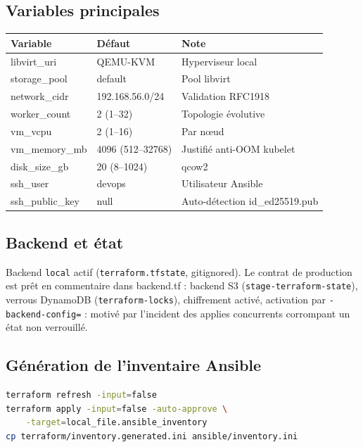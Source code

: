 \documentclass[12pt,a4paper,twoside,openright]{report}
\begin{document}
\subsection{Variables principales}
\begin{center}\label{tab:ch-terraform-variables-principales}\end{center}
\begin{longtable}{@{}p{4.6cm}p{4.0cm}p{5.6cm}@{}}
\toprule
\textbf{Variable} & \textbf{Défaut} & \textbf{Note} \\
\midrule
\endhead
libvirt\_uri & QEMU-KVM & Hyperviseur local \\
storage\_pool & default & Pool libvirt \\
network\_cidr & 192.168.56.0/24 & Validation RFC1918 \\
worker\_count & 2 (1--32) & Topologie évolutive \\
vm\_vcpu & 2 (1--16) & Par nœud \\
vm\_memory\_mb & 4096 (512--32768) & Justifié anti-OOM kubelet \\
disk\_size\_gb & 20 (8--1024) & qcow2 \\
ssh\_user & devops & Utilisateur Ansible \\
ssh\_public\_key & null & Auto-détection id\_ed25519.pub \\
\bottomrule
\end{longtable}

\subsection{Backend et état}
Backend \texttt{local} actif (\texttt{terraform.tfstate}, gitignored). Le contrat de production est prêt en commentaire dans backend.tf : backend S3 (\texttt{stage-terraform-state}), verrous DynamoDB (\texttt{terraform-locks}), chiffrement activé, activation par \texttt{-backend-config=} : motivé par l'incident des applies concurrents corrompant un état non verrouillé.

\subsection{Génération de l'inventaire Ansible}
\begin{lstlisting}[language=bash,caption={Cycle inventaire : Terraform seule source de vérité (scripts/generate-inventory.sh)}]
terraform refresh -input=false
terraform apply -input=false -auto-approve \
    -target=local_file.ansible_inventory
cp terraform/inventory.generated.ini ansible/inventory.ini
\end{lstlisting}
\end{document}
